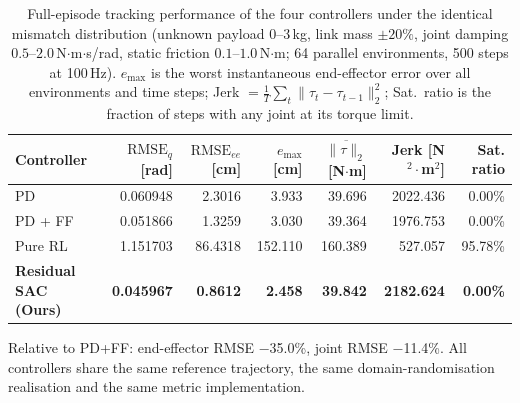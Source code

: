 \begin{table}[t]
  \centering
  \caption{Full-episode tracking performance of the four controllers under the identical mismatch distribution (unknown payload $0$--$3$\,kg, link mass $\pm20\%$, joint damping $0.5$--$2.0$\,N$\cdot$m$\cdot$s/rad, static friction $0.1$--$1.0$\,N$\cdot$m; 64 parallel environments, 500 steps at 100\,Hz). $e_{\max}$ is the worst instantaneous end-effector error over all environments and time steps; Jerk $=\frac{1}{T}\sum_t\|\tau_t-\tau_{t-1}\|_2^2$; Sat.\ ratio is the fraction of steps with any joint at its torque limit.}
  \label{tab:baseline}
  \begin{tabular}{lrrrrrr}
    \toprule
    Controller & $\mathrm{RMSE}_q$ [rad] & $\mathrm{RMSE}_{ee}$ [cm] & $e_{\max}$ [cm] & $\overline{\|\tau\|_2}$ [N$\cdot$m] & Jerk [N$^2\cdot$m$^2$] & Sat. ratio \\
    \midrule
    PD & 0.060948 & 2.3016 & 3.933 & 39.696 & 2022.436 & 0.00\% \\
    PD + FF & 0.051866 & 1.3259 & 3.030 & 39.364 & 1976.753 & 0.00\% \\
    Pure RL & 1.151703 & 86.4318 & 152.110 & 160.389 & 527.057 & 95.78\% \\
    \textbf{Residual SAC (Ours)} & \textbf{0.045967} & \textbf{0.8612} & \textbf{2.458} & \textbf{39.842} & \textbf{2182.624} & \textbf{0.00\%} \\
    \bottomrule
  \end{tabular}
  \vspace{2pt}
  \begin{minipage}{\linewidth}\footnotesize
  Relative to PD+FF: end-effector RMSE $-$35.0\%, joint RMSE $-$11.4\%. All controllers share the same reference trajectory, the same domain-randomisation realisation and the same metric implementation.
  \end{minipage}
\end{table}

